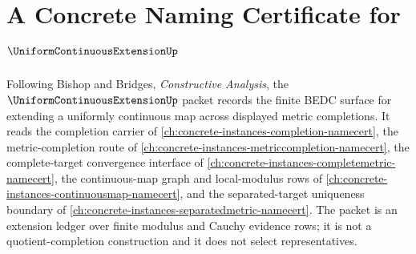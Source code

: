 \chapter{A Concrete Naming Certificate for $\UniformContinuousExtensionUp$}
\label{ch:concrete-instances-uniform-continuous-extension-namecert}

Following Bishop and Bridges, \emph{Constructive Analysis}, the $\UniformContinuousExtensionUp$ packet records the finite BEDC surface for extending a uniformly continuous map across displayed metric completions. It reads the completion carrier of \autoref{ch:concrete-instances-completion-namecert}, the metric-completion route of \autoref{ch:concrete-instances-metriccompletion-namecert}, the complete-target convergence interface of \autoref{ch:concrete-instances-completemetric-namecert}, the continuous-map graph and local-modulus rows of \autoref{ch:concrete-instances-continuousmap-namecert}, and the separated-target uniqueness boundary of \autoref{ch:concrete-instances-separatedmetric-namecert}. The packet is an extension ledger over finite modulus and Cauchy evidence rows; it is not a quotient-completion construction and it does not select representatives.

